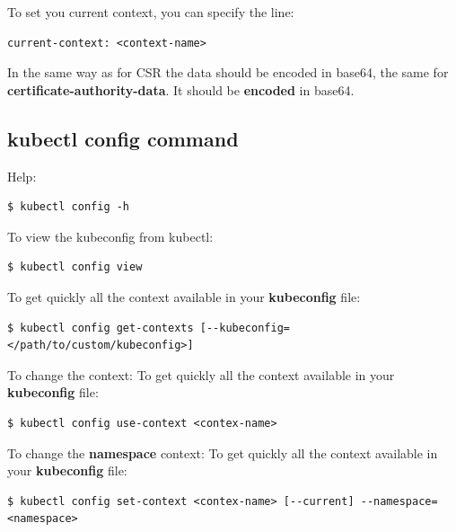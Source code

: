 \documentclass{article}
\newenvironment{blocktemplateIII}[1]{%
    \tcolorbox[beamer,%
    noparskip,breakable,
    ,colframe=Red,%
    colbacklower=LimeGreen!75!LightGreen,%
    title=#1]}%
    {\endtcolorbox}
\newenvironment{codetemplate}[1][]{%
  \mybasecolorbox[#1]
  \itshape
}{%
  \endmybasecolorbox
}
\begin{document}
To set you current context, you can specify the line:
\begin{codetemplate}{}
\begin{verbatim}
current-context: <context-name>
\end{verbatim}
\end{codetemplate}

\begin{blocktemplateIII}{WARNING}
In the same way as for CSR the data should be encoded in base64, the same for \textbf{certificate-authority-data}. It should be \textbf{encoded} in base64.
\end{blocktemplateIII}

\subsection{kubectl config command}
Help:
\begin{codetemplate}{}
\begin{verbatim}
$ kubectl config -h
\end{verbatim}
\end{codetemplate}

To view the kubeconfig from kubectl:
\begin{codetemplate}{}
\begin{verbatim}
$ kubectl config view
\end{verbatim}
\end{codetemplate}

To get quickly all the context available in your \textbf{kubeconfig} file:
\begin{codetemplate}{}
\begin{verbatim}
$ kubectl config get-contexts [--kubeconfig=</path/to/custom/kubeconfig>]
\end{verbatim}
\end{codetemplate}

To change the context:
To get quickly all the context available in your \textbf{kubeconfig} file:
\begin{codetemplate}{}
\begin{verbatim}
$ kubectl config use-context <contex-name>
\end{verbatim}
\end{codetemplate}

To change the \textbf{namespace} context:
To get quickly all the context available in your \textbf{kubeconfig} file:
\begin{codetemplate}{}
\begin{verbatim}
$ kubectl config set-context <contex-name> [--current] --namespace=<namespace>
\end{verbatim}
\end{codetemplate}
\end{document}
